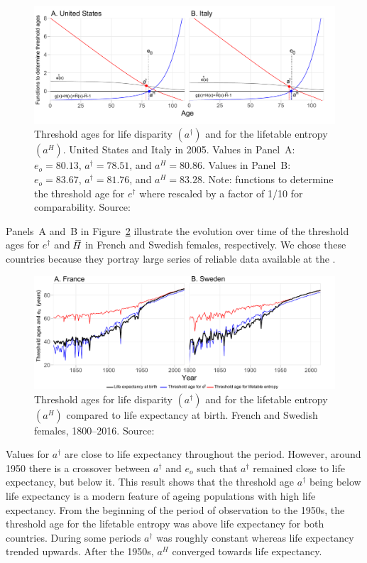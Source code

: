 \documentclass[a4paper,twoside, openright, 12pt, leqno]{article}
\newcommand*\xbar[1]{%
   \hbox{%
     \vbox{%
       \hrule height 0.5pt %
       \kern0.3ex%
       \hbox{%
         \kern-0.28em%
         \ensuremath{#1}%
         \kern-0.05em%
       }%
     }%
   }%
}
\begin{document}
\begin{figure}[h]
  \centering
  \includegraphics[width=.9\textwidth]{Figures/Ages2005}
  \caption{Threshold ages for life disparity $(a^\dagger)$ and for the lifetable entropy $(a^H)$. United States and Italy in 2005. Values in Panel~A: $e_o=80.13$, $a^\dagger=78.51$, and $a^H=80.86$. Values in Panel~B: $e_o=83.67$, $a^\dagger=81.76$, and $a^H=83.28$. Note: functions to determine the threshold age for $e^\dagger$ where rescaled by a factor of 1/10 for comparability. Source: \cite{HMD}}
  \label{fig:Fig1}
\end{figure}

Panels~A and~B in Figure~\ref{fig:Fig2} illustrate the evolution over time of the threshold ages for $e^\dagger$ and $\,\xbar{H}$ in French and Swedish females, respectively. We chose these countries because they portray large series of reliable data available at the \cite{HMD}.
%
\begin{figure}[h]
	\centering
	\includegraphics[width=.9\textwidth]{Figures/Threshold_ages}
	\caption{Threshold ages for life disparity $(a^\dagger)$ and for the lifetable entropy $(a^H)$ compared to life expectancy at birth. French and Swedish females, 1800--2016. Source: \cite{HMD}}
	\label{fig:Fig2}
\end{figure}

Values for $a^\dagger$ are close to life expectancy throughout the period. However, around 1950 there is a crossover between $a^\dagger$ and $e_o$ such that $a^\dagger$ remained close to life expectancy, but below it. This result shows that the threshold age $a^\dagger$ being below life expectancy is a modern feature of ageing populations with high life expectancy. From the beginning of the period of observation to the 1950s, the threshold age for the lifetable entropy was above life expectancy for both countries. During some periods $a^\dagger$ was roughly constant whereas life expectancy trended upwards. After the 1950s, $a^H$ converged towards life expectancy. 
\end{document}

